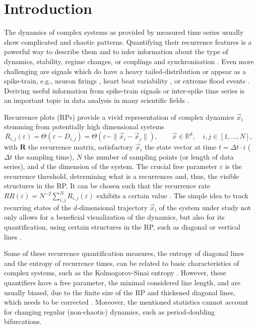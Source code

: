 \documentclass[entropy,article,submit,pdftex,moreauthors]{Definitions/mdpi}
\begin{document}
\section{Introduction}\label{sec_tau_rr_intro}

The dynamics of complex systems as provided by measured time series usually show complicated and chaotic patterns.
Quantifying their recurrence features is a powerful way to describe them and to infer information about 
the type of dynamics, stability, regime changes, or couplings and synchronisation \cite{marwan2007,marwan2008epjst,webber2015}.
Even more challenging are signals which do have a heavy tailed-distribution or appear as a spike-train,
e.g., neuron firings \cite{Dummer2014,Orcioni2020}, heart beat variability \cite{marwan2002herz}, 
or extreme flood events \cite{banerjee2021}.
Deriving useful information from spike-train signals or inter-spike time series is an important
topic in data analysis in many scientific fields \cite{Kajikawa2005,Dummer2014,Orcioni2020,Canale2021}.

Recurrence plots (RPs) provide a vivid representation of complex dynamics $\vec{x}_i$ stemming from potentially high dimensional systems \cite{marwan2007}
\begin{equation}\label{eq_rp_definition}
R_{i,j}(\varepsilon) = \Theta\left(\varepsilon - D_{i,j}\right) 
= \Theta\left(\varepsilon - \| \vec{x}_i - \vec{x}_j\|\right), \qquad \vec{x} \in \mathbb{R}^d, \quad i,j \in [1,\ldots, N],
\end{equation}
with $\mathbf{R}$ the recurrence matrix, satisfactory $\vec{x}_i$ the state vector at time 
$t = \Delta t \cdot i$ ($\Delta t$ the sampling time), $N$ the number of
sampling points (or length of data series), and $d$ the dimension of the system.
The crucial free parameter $\varepsilon$ is the recurrence threshold, determining what is a recurrences
and, thus, the visible structures in the RP. It can be chosen such that the recurrence rate 
$RR(\varepsilon)=N^{-2}\sum_{i,j}^N R_{i,j}(\varepsilon)$ exhibits a certain value \cite{kraemer2018}.
The simple idea to track recurring states of the $d$-dimensional trajectory $\vec{x}_i$ of the system under study not only allows for a beneficial visualization of the dynamics, 
but also for its 
quantification, using certain structures in the RP, such as diagonal or vertical lines \cite{marwan2007}. 

Some of these recurrence quantification measures, the entropy of diagonal lines and the entropy of 
recurrence times, can be related to basic characteristics of complex systems, such as the Kolmogorov-Sinai entropy \cite{march2005,baptista2010}. However, these quantifiers have a free parameter, the minimal considered line length, and 
are usually biased, due to the finite size of the RP and thickened diagonal lines, which needs to be corrected \cite{Kraemer2019}. Moreover, the mentioned statistics cannot account for 
changing regular (non-chaotic) dynamics, such as period-doubling bifurcations.
\end{document}
